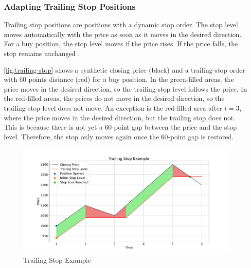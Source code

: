 \subsubsection{Adapting Trailing Stop Positions}

Trailing stop positions are positions with a dynamic stop order.
The stop level moves automatically with the price as soon as it moves in the desired direction.
For a buy position, the stop level moves if the price rises.
If the price falls, the stop remains unchanged \cite{ig-trailing}.

\autoref{fig:trailing-stop} shows a synthetic closing price (black) and a trailing-stop order with 60 points distance (red) for a buy position.
In the green-filled areas, the price moves in the desired direction, so the trailing-stop level follows the price.
In the red-filled areas, the prices do not move in the desired direction, so the trailing-stop level does not move.
An exception is the red-filled area after $t=3$, where the price moves in the desired direction, but the trailing stop does not.
This is because there is not yet a 60-point gap between the price and the stop level.
Therefore, the stop only moves again once the 60-point gap is restored.

\begin{figure}[H]
    \centering
    \includegraphics[width=\textwidth]{images/trading-engine/trailing-stop}
    \caption{Trailing Stop Example}
    \label{fig:trailing-stop}
\end{figure}
